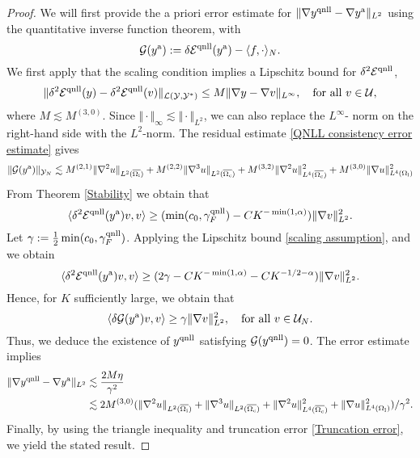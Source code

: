 \begin{proof}
	We will first provide the a priori error estimate for $\Vert \nabla y^{{\rm qnll}} - \nabla y^{{\rm a}}\Vert_{L^2}$ using the quantitative inverse function theorem, with
	\begin{equation*}
		\mathcal{G}( y^{{\rm a}}):=\delta \mathcal{E}^{{\rm qnll}}( y^{{\rm a}}) - \langle f,\cdot\rangle_{N}.
	\end{equation*}
	We first apply that the scaling condition implies a Lipschitz bound for $\delta^{2}\mathcal{E}^{{\rm qnll}}$, 
	\begin{equation}\label{scaling assumption}
		\Vert \delta^2 \mathcal{E}^{{\rm qnll}} (y) - \delta^2 \mathcal{E}^{{\rm qnll}}(v)\Vert_{\mathcal{L}(\mathcal{Y},\mathcal{Y}^{*})}\le M \Vert \nabla y-\nabla v\Vert_{L^{\infty}}, \quad \text{for all } v \in \mathcal{U},
	\end{equation}
	where $M \lesssim M^{(3,0)}$. Since $\Vert \cdot \Vert_{\infty} \lesssim \Vert \cdot \Vert_{L^2}$, we can also replace the $L^\infty$- norm on the right-hand side with the $L^2$-norm.
	The residual estimate \eqref{QNLL consistency error estimate} gives
	\begin{equation*}
		\Vert \mathcal{G}( y^{{\rm a}})\Vert_{\mathcal{Y}_{N}}\lesssim 
		M^{(2,1)}\Vert \nabla^{2} u\Vert_{L^{2}(\overline{\Omega_{{\rm i}}})} +M^{(2,2)}\Vert \nabla^{3}u \Vert_{L^{2}(\overline{\Omega_{{\rm c}}})}+M^{(3,2)}\Vert \nabla^{2}u \Vert^{2}_{L^{4}(\overline{\Omega_{{\rm c}}})}+ M^{(3,0)}\Vert \nabla u \Vert^{2}_{L^{4}(\Omega_{{\rm l}})}
	\end{equation*}
	From Theorem \ref{Stability} we obtain that
	\begin{equation*}
		\langle \delta^{2}\mathcal{E}^{{\rm qnll}} (y^{{\rm a}})v,v\rangle \ge (\min(c_{0},\gamma^{{\rm qnll}}_{F})-CK^{-\min(1,\alpha)})\Vert \nabla v \Vert_{L^{2}}^{2}.
	\end{equation*}
	Let $\gamma:=\frac{1}{2}\min(c_{0},\gamma^{{\rm qnll}}_{F})$. Applying the Lipschitz bound \eqref{scaling assumption}, and we obtain
	\begin{equation*}
		\langle \delta^{2}\mathcal{E}^{{\rm qnll}} (y^{{\rm a}})v,v\rangle \ge (2\gamma-CK^{-\min(1,\alpha)}-CK^{-1/2-\alpha})\Vert \nabla v \Vert_{L^{2}}^{2}.
	\end{equation*}
	Hence, for $K$ sufficiently large, we obtain that
	\begin{equation*}
		\langle \delta\mathcal{G} (y^{{\rm a}})v,v\rangle \ge \gamma\Vert \nabla v \Vert_{L^{2}}^{2}, \quad \text{for all }v\in\mathcal{U}_{N}.
	\end{equation*}
	Thus, we deduce the existence of $y^{{\rm qnll}}$ satisfying $\mathcal{G}(y^{{\rm qnll}})=0$. The error estimate implies
	\begin{equation*}
		\begin{aligned}
			\Vert \nabla y^{{\rm qnll}} - \nabla y^{{\rm a}}\Vert_{L^2}&\lesssim \frac{2M\eta}{\gamma^2} \\
			&\lesssim  2M^{(3,0)}(\Vert \nabla^{2} u\Vert_{L^{2}(\overline{\Omega_{{\rm i}}})} +\Vert \nabla^{3}u \Vert_{L^{2}(\overline{\Omega_{{\rm c}}})}+\Vert \nabla^{2}u \Vert^{2}_{L^{4}(\overline{\Omega_{{\rm c}}})}
			+ \Vert \nabla u \Vert^{2}_{L^{4}(\Omega_{{\rm l}})})/\gamma^2.
		\end{aligned}
	\end{equation*}
	Finally, by using the triangle inequality and truncation error \eqref{Truncation error}, we yield the stated result.
	
\end{proof}

